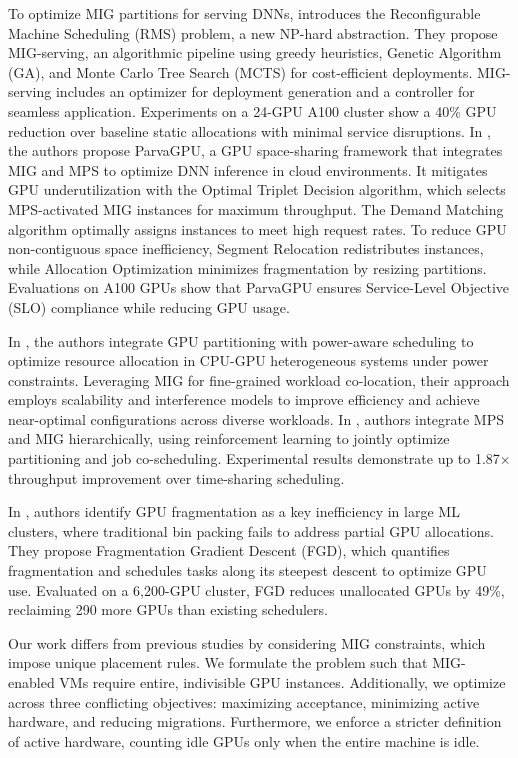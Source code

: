 	To optimize MIG partitions for serving DNNs, \cite{tan2021serving} introduces the Reconfigurable Machine Scheduling (RMS) problem, a new NP-hard abstraction. They propose MIG-serving, an algorithmic pipeline using greedy heuristics, Genetic Algorithm (GA), and Monte Carlo Tree Search (MCTS) for cost-efficient deployments. MIG-serving includes an optimizer for deployment generation and a controller for seamless application. Experiments on a 24-GPU A100 cluster show a 40\% GPU reduction over baseline static allocations with minimal service disruptions. In \cite{lee2024parvagpu}, the authors propose ParvaGPU, a GPU space-sharing framework that integrates MIG and MPS to optimize DNN inference in cloud environments. It mitigates GPU underutilization with the Optimal Triplet Decision algorithm, which selects MPS-activated MIG instances for maximum throughput. The Demand Matching algorithm optimally assigns instances to meet high request rates. To reduce GPU non-contiguous space inefficiency, Segment Relocation redistributes instances, while Allocation Optimization minimizes fragmentation by resizing partitions. Evaluations on A100 GPUs show that ParvaGPU ensures Service-Level Objective (SLO) compliance while reducing GPU usage.
	
	In \cite{arima2022optimizing}, the authors integrate GPU partitioning with power-aware scheduling to optimize resource allocation in CPU-GPU heterogeneous systems under power constraints. Leveraging MIG for fine-grained workload co-location, their approach employs scalability and interference models to improve efficiency and achieve near-optimal configurations across diverse workloads. In \cite{saroliya2023hierarchical}, authors integrate MPS and MIG hierarchically, using reinforcement learning to jointly optimize partitioning and job co-scheduling. Experimental results demonstrate up to 1.87× throughput improvement over time-sharing scheduling.
	
	In \cite{weng_beware_2023}, authors identify GPU fragmentation as a key inefficiency in large ML clusters, where traditional bin packing fails to address partial GPU allocations. They propose Fragmentation Gradient Descent (FGD), which quantifies fragmentation and schedules tasks along its steepest descent to optimize GPU use. Evaluated on a 6,200-GPU cluster, FGD reduces unallocated GPUs by 49\%, reclaiming 290 more GPUs than existing schedulers.
	
	Our work differs from previous studies by considering MIG constraints, which impose unique placement rules. We formulate the problem such that MIG-enabled VMs require entire, indivisible GPU instances. Additionally, we optimize across three conflicting objectives: maximizing acceptance, minimizing active hardware, and reducing migrations. Furthermore, we enforce a stricter definition of active hardware, counting idle GPUs only when the entire machine is idle.
